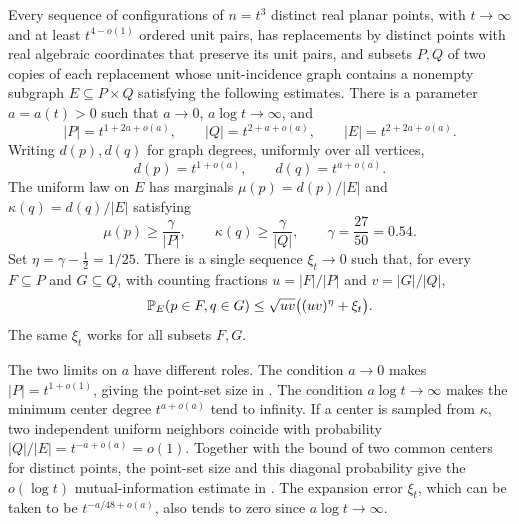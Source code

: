 \begin{proposition}\label{inc:piece}
Every sequence of configurations of \(n=t^3\) distinct real planar points,
with \(t\to\infty\) and at least \(t^{4-o(1)}\) ordered unit pairs,
has replacements by distinct points with real algebraic coordinates
that preserve its unit pairs, and subsets \(P,Q\) of two copies of each
replacement whose unit-incidence graph contains a nonempty subgraph
\(E\subseteq P\times Q\) satisfying the following estimates. There is
a parameter \(a=a(t)>0\) such that \(a\to0\),
\(a\log t\to\infty\), and
\begin{equation}\label{inc:scales}
 |P|=t^{1+2a+o(a)},\qquad
 |Q|=t^{2+a+o(a)},\qquad
 |E|=t^{2+2a+o(a)}.
\end{equation}
Writing \(d(p),d(q)\) for graph degrees, uniformly over all vertices,
\begin{equation}\label{inc:degrees}
 d(p)=t^{1+o(a)},\qquad d(q)=t^{a+o(a)}.
\end{equation}
The uniform law on \(E\) has marginals
\(\mu(p)=d(p)/|E|\) and \(\kappa(q)=d(q)/|E|\) satisfying
\begin{equation}\label{inc:marginal-atoms}
 \mu(p)\ge\frac{\gamma}{|P|},\qquad
 \kappa(q)\ge\frac{\gamma}{|Q|},\qquad
 \gamma=\frac{27}{50}=0.54.
\end{equation}
Set \(\eta=\gamma-\tfrac12=1/25\). There is a single sequence
\(\xi_t\to0\) such that, for every \(F\subseteq P\) and
\(G\subseteq Q\), with counting fractions
\(u=|F|/|P|\) and \(v=|G|/|Q|\),
\begin{equation}\label{inc:expansion}
 \mathbb P_E(p\in F,q\in G)
 \le \sqrt{uv}\bigl((uv)^\eta+\xi_t\bigr).
\end{equation}
The same \(\xi_t\) works for all subsets \(F,G\).
\end{proposition}

The two limits on \(a\) have different roles. The condition \(a\to0\)
makes \(|P|=t^{1+o(1)}\), giving the point-set size in
. The condition \(a\log t\to\infty\)
makes the minimum center degree \(t^{a+o(a)}\) tend to infinity.
If a center is sampled from \(\kappa\), two independent uniform
neighbors coincide with probability \(|Q|/|E|=t^{-a+o(a)}=o(1)\).
Together with the bound of two common centers for distinct points,
the point-set size and this diagonal probability give the
\(o(\log t)\) mutual-information estimate in .
The expansion error \(\xi_t\), which can be taken to be
\(t^{-a/48+o(a)}\), also tends to zero since \(a\log t\to\infty\).

